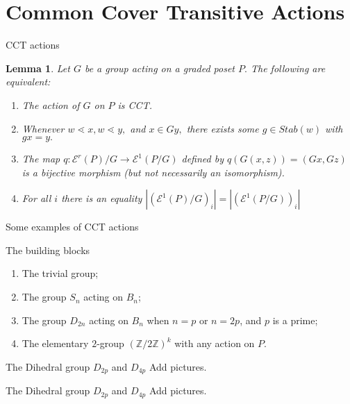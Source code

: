 \documentclass{beamer}
\newtheorem{lem}[thm]{Lemma}
\theoremstyle{remark}
\begin{document}
\section{Common Cover Transitive Actions}
\begin{frame}{CCT actions}
\begin{lem}
\label{lem:cover_transitive_equivalence}
Let $G$ be a group acting on a graded poset $P.$ The following are equivalent:
\begin{enumerate}
	\item The action of $G$ on $P$ is CCT.
	\item Whenever $w \lessdot x,w \lessdot y,$ and $x \in Gy,$ there exists some $g \in Stab(w)$ with $gx = y.$
	\item The map $q\colon \mathcal E^r(P)/G\rightarrow \mathcal E^1(P/G)$ defined by $q(G(x, z)) = (Gx,Gz)$ is a bijective morphism (but not necessarily an isomorphism).
	\item For all $i$ there is an equality $|(\mathcal E^1(P)/G)_i|=| (\mathcal E^1(P/G))_i|$
\end{enumerate}
\end{lem}
\end{frame}





\begin{frame}{Some examples of CCT actions}
\begin{block}{The building blocks}
\begin{enumerate}
\item The trivial group;
\pause
\item The group $S_n$ acting on $B_n$;
\pause
\item The group $D_{2n}$ acting on $B_{n}$ when $n = p$ or $n = 2p$, and $p$ is a prime;
\pause
\item The elementary $2$-group $(\mathbb Z /2 \mathbb Z)^k$ with any action on $P$.
\end{enumerate}
\end{block}
\end{frame}





\begin{frame}{The Dihedral group $D_{2p}$ and $D_{4p}$}
Add pictures.
\end{frame}





\begin{frame}{The Dihedral group $D_{2p}$ and $D_{4p}$}
Add pictures.
\end{frame}
\end{document}
